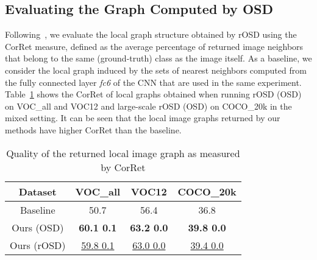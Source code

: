 \documentclass[runningheads]{llncs}
\begin{document}
\begin{table}[tb]
    \centering
    \caption{\small Multi-object colocalization and discovery performance of rOSD compared to competitors on VOC\_all and VOC12 datasets when using smaller values of  () and  () threshold}
    \label{table:multiple_perf_all_supp_new}
    \vspace{-10pt}
\end{table}

\subsection{Evaluating the Graph Computed by OSD}

Following~\cite{CKSP15}, we evaluate the local graph structure obtained by rOSD using the CorRet measure, defined as the average percentage of returned image neighbors that belong to the same (ground-truth) class as the image itself. As a baseline, we consider the local graph induced by the sets of nearest neighbors  computed from the fully connected layer \textit{fc6} of the CNN that are used in the same experiment. Table~\ref{table:corret} shows the CorRet of local graphs obtained when running rOSD (OSD) on VOC\_all and VOC12 and large-scale rOSD (OSD) on COCO\_20k in the mixed setting. It can be seen that the local image graphs returned by our methods have higher CorRet than the baseline.
\begin{table}[tb]
    \centering
    \caption{\small Quality of the returned local image graph as measured by CorRet}
    \label{table:corret}
    \setlength{\tabcolsep}{1em}
    \begin{tabular}{cccc}
        \toprule
        Dataset & VOC\_all & VOC12 & COCO\_20k  \\
        \midrule
        Baseline & 50.7 & 56.4 & 36.8 \\
        Ours (OSD) & \textbf{60.1  0.1} & \textbf{63.2  0.0} & \textbf{39.8  0.0} \\
        Ours (rOSD) & \underline{59.8  0.1} & \underline{63.0  0.0} & \underline{39.4  0.0} \\
        \bottomrule
    \end{tabular}
\end{table}
\end{document}
